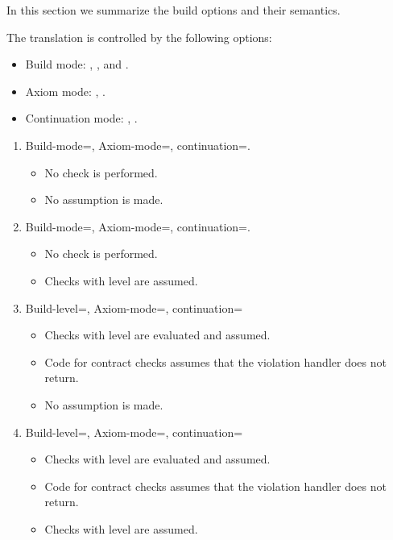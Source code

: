 In this section we summarize the build options and their semantics.

The translation is controlled by the following options:

\begin{itemize}
  \item Build mode: , , and .
  \item Axiom mode: , .
  \item Continuation mode: , .
\end{itemize}

\begin{enumerate}

\item Build-mode=, Axiom-mode=, continuation=.
\begin{itemize}
  \item No check is performed.
  \item No assumption is made.
\end{itemize}

\item Build-mode=, Axiom-mode=, continuation=.
\begin{itemize}
  \item No check is performed.
  \item Checks with  level are assumed.
\end{itemize}

\item Build-level=, Axiom-mode=, continuation=
\begin{itemize}
  \item Checks with  level are evaluated and assumed.
  \item Code for contract checks assumes that the violation handler does not return.
  \item No assumption is made.
\end{itemize}

\item Build-level=, Axiom-mode=, continuation=
\begin{itemize}
  \item Checks with  level are evaluated and assumed.
  \item Code for contract checks assumes that the violation handler does not return.
  \item Checks with  level are assumed.
\end{itemize}


\end{enumerate}
